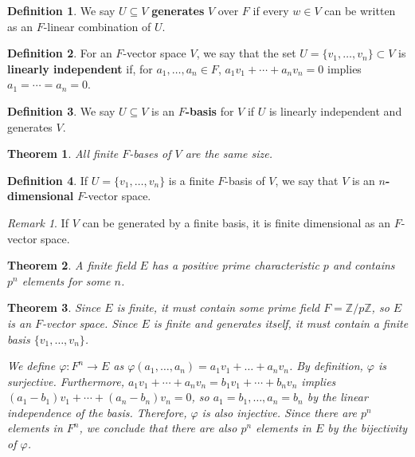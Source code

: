 \documentclass[parskip=half]{scrartcl}  %
\theoremstyle{definition}
\newtheorem{definition}{Definition}[section]
\theoremstyle{plain}
\newtheorem{theorem}{Theorem}[definition]
\theoremstyle{remark}
\newtheorem{remark}{Remark}[definition]
\begin{document}
\begin{definition}
    We say $U\subseteq V$ \textbf{generates} $V$ over $F$ if every $w\in V$ can be written as an
    $F$-linear combination of $U$.
\end{definition}

\begin{definition}
    For an $F$-vector space $V$, we say that the set $U=\{v_1,\dots,v_n\}\subset V$ is
    \textbf{linearly independent} if, for $a_1,\dots,a_n\in F$, $a_1v_1+\cdots+a_nv_n=0$ implies
    $a_1=\cdots=a_n=0$.
\end{definition}

\begin{definition}
    We say $U\subseteq V$ is an \textbf{$F$-basis} for $V$ if $U$ is linearly independent and
    generates $V$.
\end{definition}

\begin{theorem}
    All finite $F$-bases of $V$ are the same size.
\end{theorem}

\begin{definition}
    If $U=\{v_1,\dots,v_n\}$ is a finite $F$-basis of $V$, we say that $V$ is an
    \textbf{$n$-dimensional} $F$-vector space.
\end{definition}

\begin{remark}
    If $V$ can be generated by a finite basis, it is finite dimensional as an $F$-vector space.
\end{remark}

\begin{theorem}
    A finite field $E$ has a positive prime characteristic $p$ and contains $p^n$ elements for some
    $n$.
\end{theorem}

\begin{theorem}
    Since $E$ is finite, it must contain some prime field $F=\mathbb{Z}/p\mathbb{Z}$, so $E$ is an
    $F$-vector space.
    Since $E$ is finite and generates itself, it must contain a finite basis $\{v_1,\dots,v_n\}$.

    We define $\varphi:F^n\to E$ as $\varphi(a_1,\dots,a_n)=a_1v_1+\dots+a_nv_n$.
    By definition, $\varphi$ is surjective.
    Furthermore, $a_1v_1+\cdots+a_nv_n=b_1v_1+\cdots+b_nv_n$ implies 
    $(a_1-b_1)v_1+\cdots+(a_n-b_n)v_n=0$, so $a_1=b_1,\dots,a_n=b_n$ by the linear independence of
    the basis.
    Therefore, $\varphi$ is also injective.
    Since there are $p^n$ elements in $F^n$, we conclude that there are also $p^n$ elements in $E$
    by the bijectivity of $\varphi$.
\end{theorem}
\end{document}
